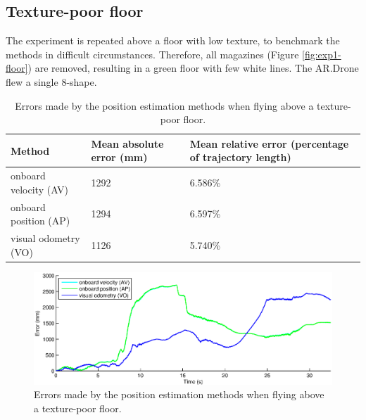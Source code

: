 





\subsection{Texture-poor floor}
\label{sec:exp1-texture-poor}
The experiment is repeated above a floor with low texture, to benchmark the methods in difficult circumstances.
Therefore, all magazines (Figure \ref{fig:exp1-floor}) are removed, resulting in a green floor with few white lines.
The AR.Drone flew a single 8-shape.


\begin{table}[htb!]
    \centering
    \begin{tabular}
        { | l | l | l | } 
	\hline
	Method & Mean absolute error (\small{mm}) & Mean relative error (percentage of trajectory length) \\
        \hline
        onboard velocity (AV) & 1292 & 6.586\% \\
	onboard position (AP) & 1294 & 6.597\% \\
	visual odometry (VO) & 1126 & 5.740\% \\
	\hline
    \end{tabular}
    \caption{Errors made by the position estimation methods when flying above a texture-poor floor.}
    \label{tab:res_mapping-poor}
\end{table}

\begin{figure}[htb!]
\centering
\includegraphics[width=\linewidth]{images/exp1-run2-error.eps}
\caption{Errors made by the position estimation methods when flying above a texture-poor floor.}
\label{fig:exp1-notexture-error}
\end{figure}

